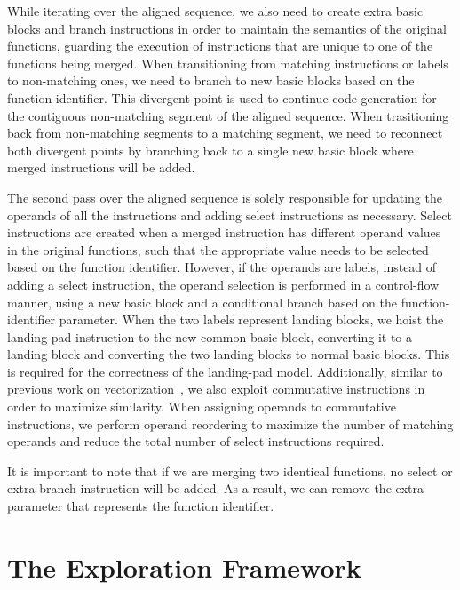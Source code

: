 While iterating over the aligned sequence, we also need to create extra basic
blocks and branch instructions in order to maintain the semantics of the
original functions, guarding the execution of instructions that are unique to
one of the functions being merged.
When transitioning from matching instructions or labels to non-matching ones,
we need to branch to new basic blocks based on the function identifier.
This divergent point is used to continue code generation for the contiguous
non-matching segment of the aligned sequence.
When trasitioning back from non-matching segments to a matching segment, we need
to reconnect both divergent points by branching back to a single new basic block
where merged instructions will be added.

The second pass over the aligned sequence is solely responsible for updating
the operands of all the instructions and adding select instructions as necessary.
Select instructions are created when a merged instruction has different operand
values in the original functions, such that the appropriate value needs to be
selected based on the function identifier.
However, if the operands are labels, instead of adding a select instruction,
the operand selection is performed in a control-flow manner, using a new basic
block and a conditional branch based on the function-identifier parameter.
When the two labels represent landing blocks, we hoist the landing-pad
instruction to the new common basic block, converting it to a landing block and
converting the two landing blocks to normal basic blocks.
This is required for the correctness of the landing-pad model.
Additionally, similar to previous work on vectorization~\cite{porpodas18}, we
also exploit commutative instructions in order to maximize similarity.
When assigning operands to commutative instructions, we perform operand
reordering to maximize the number of matching operands and reduce the total
number of select instructions required.

It is important to note that if we are merging two identical functions, no
select or extra branch instruction will be added.
As a result, we can remove the extra parameter that represents the function
identifier.

\vspace{-1ex}
\section{The Exploration Framework}
\label{sec:framework}


